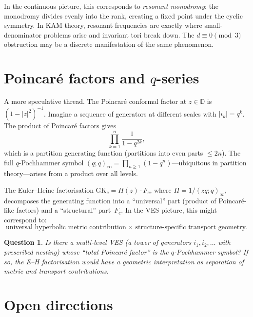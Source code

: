 \documentclass[11pt]{article}
\newcommand{\D}{\mathbb{D}}
\theoremstyle{plain}
\newtheorem{question}{Question}
\theoremstyle{definition}
\theoremstyle{remark}
\begin{document}
In the continuous picture, this corresponds to \emph{resonant
monodromy}: the monodromy divides evenly into the rank, creating a
fixed point under the cyclic symmetry. In KAM theory, resonant
frequencies are exactly where small-denominator problems arise and
invariant tori break down. The $d\equiv 0\pmod{3}$ obstruction may
be a discrete manifestation of the same phenomenon.


\section{Poincar\'e factors and $q$-series}

A more speculative thread. The Poincar\'e conformal factor at
$z\in\D$ is $(1-|z|^2)^{-1}$. Imagine a sequence of generators at
different scales with $|i_k|=q^k$. The product of Poincar\'e
factors gives
\[
  \prod_{k=1}^{n}\frac{1}{1-q^{2k}},
\]
which is a partition generating function (partitions into even parts
$\le 2n$). The full $q$-Pochhammer symbol
$(q;q)_\infty = \prod_{n\ge 1}(1-q^n)$---ubiquitous in partition
theory---arises from a product over all levels.

The Euler--Heine factorisation $\mathrm{GK}_c = H(z)\cdot F_c$,
where $H=1/(zq;q)_\infty$, decomposes the generating function into a
``universal'' part (product of Poincar\'e-like factors) and a
``structural'' part~$F_c$. In the VES picture, this might correspond
to:
\[
  \text{universal hyperbolic metric contribution}
    \;\times\;
  \text{structure-specific transport geometry.}
\]

\begin{question}
Is there a multi-level VES (a tower of generators $i_1,i_2,\ldots$
with prescribed nesting) whose ``total Poincar\'e factor'' is the
$q$-Pochhammer symbol? If so, the E--H factorisation would have a
geometric interpretation as separation of metric and transport
contributions.
\end{question}


\section{Open directions}
\end{document}
